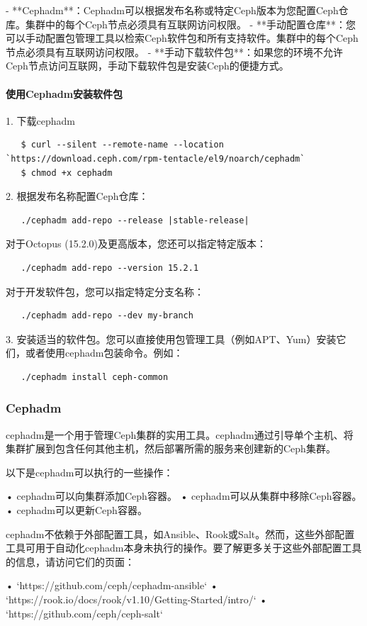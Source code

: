\documentclass[12pt,UTF8]{ctexbook}
\begin{document}
- **Cephadm**：Cephadm可以根据发布名称或特定Ceph版本为您配置Ceph仓库。集群中的每个Ceph节点必须具有互联网访问权限。
- **手动配置仓库**：您可以手动配置包管理工具以检索Ceph软件包和所有支持软件。集群中的每个Ceph节点必须具有互联网访问权限。
- **手动下载软件包**：如果您的环境不允许Ceph节点访问互联网，手动下载软件包是安装Ceph的便捷方式。

\paragraph{使用Cephadm安装软件包}
1. 下载cephadm
   \begin{verbatim}
   $ curl --silent --remote-name --location `https://download.ceph.com/rpm-tentacle/el9/noarch/cephadm`
   $ chmod +x cephadm
   \end{verbatim}

2. 根据发布名称配置Ceph仓库：
   \begin{verbatim}
   ./cephadm add-repo --release |stable-release|
   \end{verbatim}
   对于Octopus (15.2.0)及更高版本，您还可以指定特定版本：
   \begin{verbatim}
   ./cephadm add-repo --version 15.2.1
   \end{verbatim}
   对于开发软件包，您可以指定特定分支名称：
   \begin{verbatim}
   ./cephadm add-repo --dev my-branch
   \end{verbatim}

3. 安装适当的软件包。您可以直接使用包管理工具（例如APT、Yum）安装它们，或者使用cephadm包装命令。例如：
   \begin{verbatim}
   ./cephadm install ceph-common
   \end{verbatim}

\subsubsection{Cephadm}
cephadm是一个用于管理Ceph集群的实用工具。cephadm通过引导单个主机、将集群扩展到包含任何其他主机，然后部署所需的服务来创建新的Ceph集群。

以下是cephadm可以执行的一些操作：

• cephadm可以向集群添加Ceph容器。
• cephadm可以从集群中移除Ceph容器。
• cephadm可以更新Ceph容器。

cephadm不依赖于外部配置工具，如Ansible、Rook或Salt。然而，这些外部配置工具可用于自动化cephadm本身未执行的操作。要了解更多关于这些外部配置工具的信息，请访问它们的页面：

• `https://github.com/ceph/cephadm-ansible`
• `https://rook.io/docs/rook/v1.10/Getting-Started/intro/`
• `https://github.com/ceph/ceph-salt`
\end{document}
